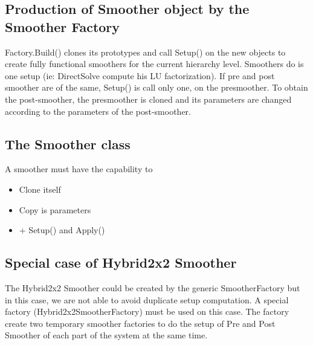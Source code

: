 \subsection{Production of Smoother object by the Smoother Factory}
Factory.Build() clones its prototypes and call Setup() on the new objects to create fully functional smoothers for the current hierarchy level. Smoothers do is one setup (ie: DirectSolve compute his LU factorization).
If  pre and post smoother are of the same, Setup() is call only one, on the presmoother. To obtain the post-smoother, the presmoother is cloned and its parameters are changed according to the parameters of the post-smoother.



\subsection{The Smoother class}
A smoother must have the capability to
\begin{itemize}
\item Clone itself
\item Copy is parameters
\item + Setup() and Apply()
\end{itemize}


\subsection{Special case of Hybrid2x2 Smoother}

The Hybrid2x2 Smoother could be created by the generic SmootherFactory but in this case, we are not able to avoid duplicate setup computation. A special factory (Hybrid2x2SmootherFactory) must be used on this case. 
The factory create two temporary smoother factories to do the setup of Pre and Post Smoother of each part of the system at the same time.

